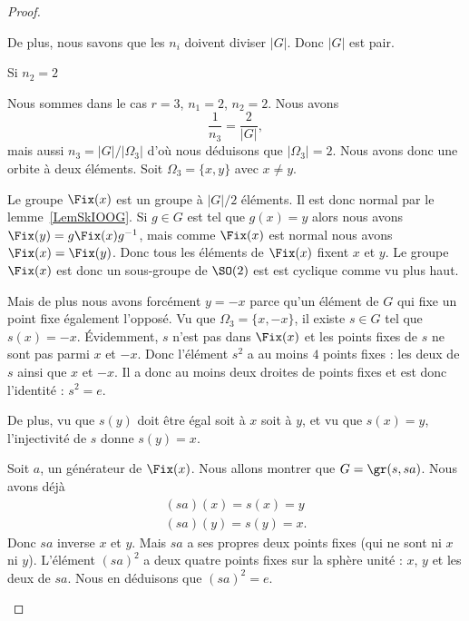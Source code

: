 \begin{proof}
\begin{subproof}
                De plus, nous savons que les \( n_i\) doivent diviser \( | G |\). Donc \( | G |\) est pair.

            \item[Si \( n_2=2\)]

                Nous sommes dans le cas \( r=3\), \( n_1=2\), \( n_2=2\). Nous avons
                \begin{equation}
                    \frac{1}{ n_3 }=\frac{ 2 }{ | G | },
                \end{equation}
                mais aussi \( n_3=| G |/| \Omega_3 |\) d'où nous déduisons que \( | \Omega_3 |=2\). Nous avons donc une orbite à deux éléments. Soit \( \Omega_3=\{ x,y \}\) avec \( x\neq y\).

                Le groupe \( \Fix(x)\) est un groupe à \( | G |/2\) éléments. Il est donc normal par le lemme~\ref{LemSkIOOG}. Si \( g\in G\) est tel que \( g(x)=y\) alors nous avons \( \Fix(y)=g\Fix(x)g^{-1}\), mais comme \( \Fix(x)\) est normal nous avons \( \Fix(x)=\Fix(y)\). Donc tous les éléments de \( \Fix(x)\) fixent \( x\) et \( y\). Le groupe \( \Fix(x)\) est donc un sous-groupe de \( \SO(2)\) est est cyclique comme vu plus haut.

                Mais de plus nous avons forcément \( y=-x\) parce qu'un élément de \( G\) qui fixe un point fixe également l'opposé. Vu que \( \Omega_3=\{ x,-x \}\), il existe \( s\in G\) tel que \( s(x)=-x\). Évidemment, \( s\) n'est pas dans \( \Fix(x)\) et les points fixes de \( s\) ne sont pas parmi \( x\) et \( -x\). Donc l'élément \( s^2\) a au moins \( 4\) points fixes : les deux de \( s\) ainsi que \( x\) et \( -x\). Il a donc au moins deux droites de points fixes et est donc l'identité : \( s^2=e\).

                De plus, vu que \( s(y)\) doit être égal soit à \( x\) soit à \( y\), et vu que \( s(x)=y\), l'injectivité de \( s\) donne \( s(y)=x\).

                Soit \( a\), un générateur de \( \Fix(x)\). Nous allons montrer que \( G=\gr(s,sa)\). Nous avons déjà
                \begin{subequations}
                    \begin{align}
                        (sa)(x)=s(x)=y\\
                        (sa)(y)=s(y)=x.
                    \end{align}
                \end{subequations}
                Donc \( sa\) inverse \( x\) et \( y\). Mais \( sa\) a ses propres deux points fixes (qui ne sont ni \( x\) ni \( y\)). L'élément \( (sa)^2\) a deux quatre points fixes sur la sphère unité : \( x\), \( y\) et les deux de \( sa\). Nous en déduisons que \( (sa)^2=e\).


\end{subproof}
\end{proof}
